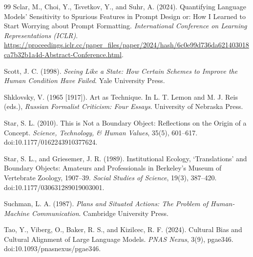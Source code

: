 \documentclass[11pt]{article}
\begin{document}
\begin{thebibliography}{99}
Sclar, M., Choi, Y., Tsvetkov, Y., and Suhr, A. (2024).
\newblock Quantifying Language Models' Sensitivity to Spurious Features in Prompt Design or: How I Learned to Start Worrying about Prompt Formatting.
\newblock \emph{International Conference on Learning Representations (ICLR)}.
\newblock \url{https://proceedings.iclr.cc/paper_files/paper/2024/hash/6c0e99d736da621403018ca7b32b1a4d-Abstract-Conference.html}.

Scott, J. C. (1998).
\newblock \emph{Seeing Like a State: How Certain Schemes to Improve the Human Condition Have Failed}.
\newblock Yale University Press.

Shklovsky, V. (1965 [1917]).
\newblock Art as Technique.
\newblock In L. T. Lemon and M. J. Reis (eds.), \emph{Russian Formalist Criticism: Four Essays}. University of Nebraska Press.

Star, S. L. (2010).
\newblock This is Not a Boundary Object: Reflections on the Origin of a Concept.
\newblock \emph{Science, Technology, \& Human Values}, 35(5), 601--617. doi:10.1177/0162243910377624.

Star, S. L., and Griesemer, J. R. (1989).
\newblock Institutional Ecology, `Translations' and Boundary Objects: Amateurs and Professionals in Berkeley's Museum of Vertebrate Zoology, 1907--39.
\newblock \emph{Social Studies of Science}, 19(3), 387--420. doi:10.1177/030631289019003001.

Suchman, L. A. (1987).
\newblock \emph{Plans and Situated Actions: The Problem of Human-Machine Communication}.
\newblock Cambridge University Press.

Tao, Y., Viberg, O., Baker, R. S., and Kizilcec, R. F. (2024).
\newblock Cultural Bias and Cultural Alignment of Large Language Models.
\newblock \emph{PNAS Nexus}, 3(9), pgae346. doi:10.1093/pnasnexus/pgae346.

\end{thebibliography}
\end{document}
